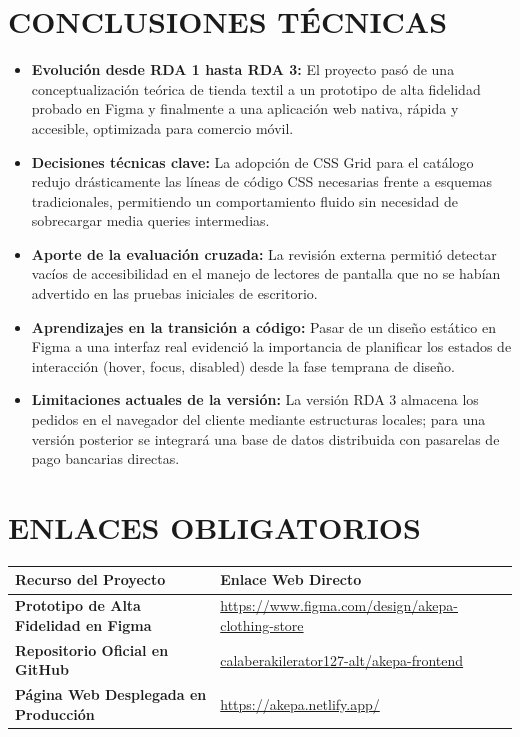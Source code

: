 \documentclass[12pt]{article}
\begin{document}
\section*{CONCLUSIONES TÉCNICAS}
\begin{itemize}
    \item \textbf{Evolución desde RDA 1 hasta RDA 3:} El proyecto pasó de una conceptualización teórica de tienda textil a un prototipo de alta fidelidad probado en Figma y finalmente a una aplicación web nativa, rápida y accesible, optimizada para comercio móvil.
    \item \textbf{Decisiones técnicas clave:} La adopción de CSS Grid para el catálogo redujo drásticamente las líneas de código CSS necesarias frente a esquemas tradicionales, permitiendo un comportamiento fluido sin necesidad de sobrecargar media queries intermedias.
    \item \textbf{Aporte de la evaluación cruzada:} La revisión externa permitió detectar vacíos de accesibilidad en el manejo de lectores de pantalla que no se habían advertido en las pruebas iniciales de escritorio.
    \item \textbf{Aprendizajes en la transición a código:} Pasar de un diseño estático en Figma a una interfaz real evidenció la importancia de planificar los estados de interacción (hover, focus, disabled) desde la fase temprana de diseño.
    \item \textbf{Limitaciones actuales de la versión:} La versión RDA 3 almacena los pedidos en el navegador del cliente mediante estructuras locales; para una versión posterior se integrará una base de datos distribuida con pasarelas de pago bancarias directas.
\end{itemize}

\section*{ENLACES OBLIGATORIOS}

\begin{table}[H]
\centering
\small
\renewcommand{\arraystretch}{1.3}
\begin{tabularx}{\textwidth}{|>{\bfseries}p{}|X|}
\hline
\textbf{Recurso del Proyecto} & \textbf{Enlace Web Directo} \\ \hline
Prototipo de Alta Fidelidad en Figma & \url{https://www.figma.com/design/akepa-clothing-store} \\ \hline
Repositorio Oficial en GitHub & \href{https://github.com/calaberakilerator127-alt/akepa-frontend}{calaberakilerator127-alt/akepa-frontend} \\ \hline
Página Web Desplegada en Producción & \href{https://akepa.netlify.app/}{https://akepa.netlify.app/} \\ \hline
\end{tabularx}
\end{table}
\end{document}
